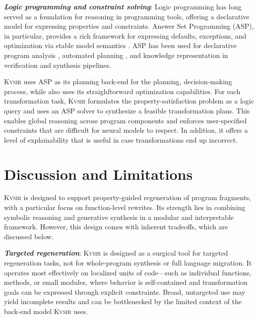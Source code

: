 \documentclass[sigplan]{acmart}
\newcommand{\sys}{{\scshape Kv{\textalpha}sir}\xspace}
\newcommand{\heading}[1]{\vspace{2pt}\noindent\textbf{\emph{#1}}:\enspace}
\begin{document}
\heading{Logic programming and constraint solving}
Logic programming has long served as a foundation for reasoning in programming
tools, offering a declarative model for expressing properties and constraints.
Answer Set Programming (ASP), in particular, provides a rich framework for
expressing defaults, exceptions, and optimization via stable model semantics
\cite{Gelfond_2000, Gelfond_2002, Eiter_2009}. ASP has been used for
declarative program analysis \cite{benton2007interactive}, automated planning
\cite{nguyen2020explainable, son2022answersetplanningsurvey}, and knowledge
representation in verification and synthesis pipelines.

\sys uses ASP as its planning back-end for the planning, decision-making
process, while also uses its straighftorward optimization capabilities.
For each transformation task, \sys formulates the property-satisfaction problem as a logic query and uses an ASP solver to
synthesize a feasible transformation plans.
This enables global reasoning across program components and enforces
user-specified constraints that are difficult for neural models to respect.
In addition, it offers a level of explainability that is useful in case transformations end up incorrect.

\section{Discussion and Limitations}

\sys is designed to support property-guided regeneration of program fragments, with a particular focus on function-level rewrites. Its strength lies in combining symbolic reasoning and generative synthesis in a modular and interpretable framework. However, this design comes with inherent tradeoffs, which are discussed below.

\heading{Targeted regeneration}
\sys is designed as a surgical tool for targeted regeneration tasks, not for whole-program synthesis or full language migration.
It operates most effectively on localized units of code—such as individual functions, methods, or small modules, where behavior is self-contained and transformation goals can be expressed through explicit constraints.
Broad, untargeted use may yield incomplete results and can be bottlenecked by the limited context of the back-end model \sys uses.
\end{document}
